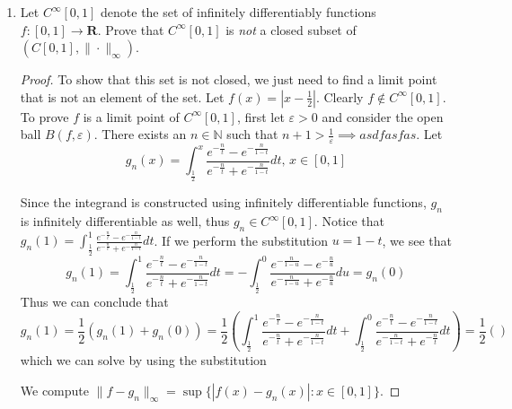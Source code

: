 \documentclass{article}
\newcommand{\R}{\mathbf{R}}
\theoremstyle{plain} %
\numberwithin{thm}{section} %
\theoremstyle{definition}
\begin{document}
    \begin{enumerate}[label=(\alph*)]
        \item Let $C^\infty[0,1]$ denote the set of infinitely differentiably functions $f:[0,1]\rightarrow \R$. Prove that $C^\infty[0,1]$ is \textit{not} a closed subset of $(C[0,1],\|\cdot\|_\infty)$.

        \begin{proof}
            To show that this set is not closed, we just need to find a limit point that is not an element of the set. Let \(f(x) = |x-\frac{1}{2}|\). Clearly \(f \notin C^{\infty} [0,1]\). To prove \(f\) is a limit point of \(C^{\infty} [0,1]\), first let \(\varepsilon > 0\) and consider the open ball \(B(f, \varepsilon)\). There exists an \(n \in \mathbb{N}\) such that \(n + 1 > \frac{1}{\varepsilon} \implies asdfasfas\). Let \[g_n(x) = \int _\frac{1}{2}^x \frac{e^{-\frac{n}{t}}-e^{-\frac{n}{1-t}}}{e^{-\frac{n}{t}}+e^{-\frac{n}{1-t}}} dt \text{, } x \in [0,1] \]

            Since the integrand is constructed using infinitely differentiable functions, \(g_n\) is infinitely differentiable as well, thus \(g_n \in C^{\infty}[0,1]\). Notice that \(g_n(1) = \int _\frac{1}{2}^1 \frac{e^{-\frac{n}{t}}-e^{-\frac{n}{1-t}}}{e^{-\frac{n}{t}}+e^{-\frac{n}{1-t}}} dt\). If we perform the substitution \(u = 1-t\), we see that
            \[
                g_n(1) = \int _\frac{1}{2}^1 \frac{e^{-\frac{n}{t}}-e^{-\frac{n}{1-t}}}{e^{-\frac{n}{t}}+e^{-\frac{n}{1-t}}} dt = -\int _\frac{1}{2}^0 \frac{e^{-\frac{n}{1-u}}-e^{-\frac{n}{u}}}{e^{-\frac{n}{1-u}}+e^{-\frac{n}{u}}} du = g_n(0)
            \]
            Thus we can conclude that
            \[
                g_n(1) = \frac{1}{2}(g_n(1) + g_n(0)) = \frac{1}{2}\left(\int _\frac{1}{2}^1 \frac{e^{-\frac{n}{t}}-e^{-\frac{n}{1-t}}}{e^{-\frac{n}{t}}+e^{-\frac{n}{1-t}}} dt + \int _\frac{1}{2}^0 \frac{e^{-\frac{n}{t}}-e^{-\frac{n}{1-t}}}{e^{-\frac{n}{1-t}}+e^{-\frac{n}{t}}} dt\right) = \frac{1}{2} \left(\right)
            \]
            which we can solve by using the substitution 
            
            We compute \(\|f-g_n\| _\infty = \sup \{|f(x) - g_n(x)| : x \in [0,1]\}\).


\end{proof}
\end{enumerate}
\end{document}
